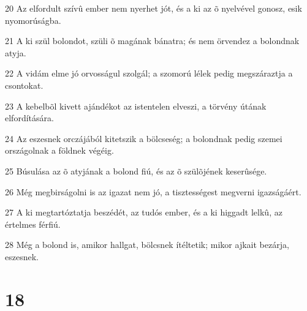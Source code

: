\par 20 Az elfordult szívû ember nem nyerhet jót, és a ki az õ nyelvével gonosz, esik nyomorúságba.
\par 21 A ki szül bolondot, szüli õ magának bánatra; és nem örvendez a bolondnak atyja.
\par 22 A vidám elme jó orvosságul szolgál; a szomorú lélek pedig megszáraztja a csontokat.
\par 23 A kebelbõl kivett ajándékot az istentelen elveszi, a törvény útának elfordítására.
\par 24 Az eszesnek orczájából kitetszik a bölcseség; a bolondnak pedig szemei országolnak a földnek végéig.
\par 25 Búsulása az õ atyjának a bolond fiú, és az õ szülõjének keserûsége.
\par 26 Még megbirságolni is az igazat nem jó, a tisztességest megverni igazságáért.
\par 27 A ki megtartóztatja beszédét, az tudós ember, és a ki higgadt lelkû, az értelmes férfiú.
\par 28 Még a bolond is, amikor hallgat, bölcsnek ítéltetik; mikor ajkait bezárja, eszesnek.

\chapter{18}

